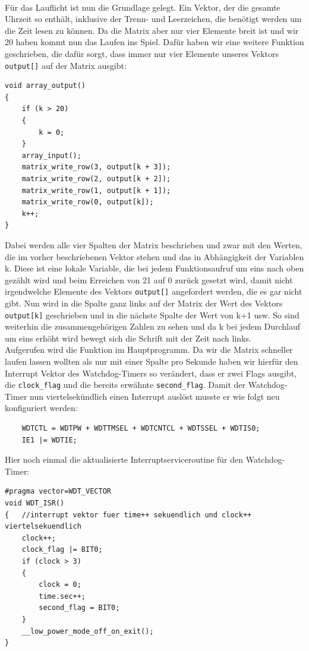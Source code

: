 \documentclass[openright,twoside,11pt,a4paper]{scrartcl}
\begin{document}
\begin{flushleft}
	 	\ \\
	 	Für das Lauflicht ist nun die Grundlage gelegt. Ein Vektor, der die gesamte Uhrzeit so enthält, inklusive der Trenn- und Leerzeichen, die benötigt werden um die Zeit lesen zu können. Da die Matrix aber nur vier Elemente breit ist und wir 20 haben kommt nun das Laufen ins Spiel. Dafür haben wir eine weitere Funktion geschrieben, die dafür sorgt, dass immer nur vier Elemente unseres Vektors \lstinline[]|output[]| auf der Matrix ausgibt:
	 	\begin{lstlisting}
void array_output()
{
	if (k > 20)
	{
		k = 0;
	}
	array_input();
	matrix_write_row(3, output[k + 3]);
	matrix_write_row(2, output[k + 2]);
	matrix_write_row(1, output[k + 1]);
	matrix_write_row(0, output[k]);
	k++;
}
	 	\end{lstlisting}
	 	Dabei werden alle vier Spalten der Matrix beschrieben und zwar mit den Werten, die im vorher beschriebenen Vektor stehen und das in Abhängigkeit der Variablen k. Diese ist eine lokale Variable, die bei jedem Funktionsaufruf um eins nach oben gezählt wird und beim Erreichen von 21 auf 0 zurück gesetzt wird, damit nicht irgendwelche Elemente des Vektors \lstinline[]|output[]| angefordert werden, die es gar nicht gibt. Nun wird in die Spalte ganz links auf der Matrix der Wert des Vektors \lstinline[]|output[k]| geschrieben und in die nächste Spalte  der Wert von k+1 usw. So sind weiterhin die zusammengehörigen Zahlen zu sehen und da k bei jedem Durchlauf um eins erhöht wird bewegt sich die Schrift mit der Zeit nach links.\\
	 	Aufgerufen wird die Funktion im Hauptprogramm. Da wir die Matrix schneller laufen lassen wollten als nur mit einer Spalte pro Sekunde haben wir hierfür den Interrupt Vektor des Watchdog-Timers so verändert, dass er zwei Flags ausgibt, die \lstinline[]|clock_flag| und die bereits erwähnte \lstinline[]|second_flag|.
Damit der Watchdog-Timer nun viertelsekündlich einen Interrupt auslöst musste er wie folgt neu konfiguriert werden:
	\begin{lstlisting}
	WDTCTL = WDTPW + WDTTMSEL + WDTCNTCL + WDTSSEL + WDTIS0; 
	IE1 |= WDTIE; 
	\end{lstlisting}
Hier noch einmal die aktualisierte Interruptserviceroutine für den Watchdog-Timer:
	 	\begin{lstlisting}
#pragma vector=WDT_VECTOR    
void WDT_ISR()
{	//interrupt vektor fuer time++ sekuendlich und clock++ viertelsekuendlich
	clock++;
	clock_flag |= BIT0;
	if (clock > 3)
	{
		clock = 0;
		time.sec++;
		second_flag = BIT0;
	}
	__low_power_mode_off_on_exit();
}
	 	\end{lstlisting}	


\end{flushleft}
\end{document}
